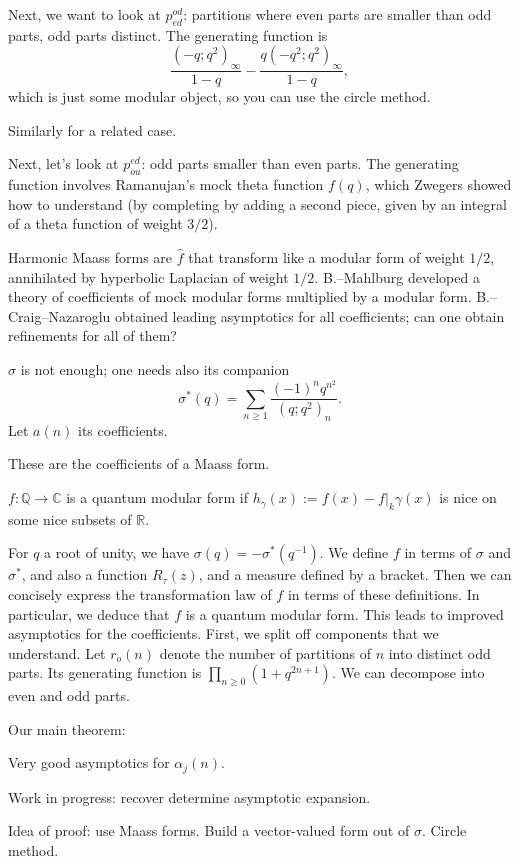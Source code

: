 \documentclass[reqno]{amsart} 
\begin{document}
Next, we want to look at $p_{e d}^{o d}$: partitions where even parts are smaller than odd parts, odd parts distinct.  The generating function is
\begin{equation*}
  \frac{(- q; q^2)_\infty}{ 1 - q}
  - \frac{q(- q^2 ; q^2)_\infty}{1 - q},
\end{equation*}
which is just some modular object, so you can use the circle method.

Similarly for a related case.

Next, let's look at $p_{o u}^{e d}$: odd parts smaller than even parts.  The generating function involves Ramanujan's mock theta function $f(q)$, which Zwegers showed how to understand (by completing by adding a second piece, given by an integral of a theta function of weight $3 /2$).

Harmonic Maass forms are $\hat{f}$ that transform like a modular form of weight $1/2$, annihilated by hyperbolic Laplacian of weight $1/2$.  B.--Mahlburg developed a theory of coefficients of mock modular forms multiplied by a modular form.  B.--Craig--Nazaroglu obtained leading asymptotics for all coefficients; can one obtain refinements for all of them?

$\sigma$ is not enough; one needs also its companion
\begin{equation*}
  \sigma^\ast(q) = \sum_{n \geq 1}
  \frac{(- 1)^n q^{n^2}}{(q; q^2)_n}.  
\end{equation*}
Let $a(n)$ its coefficients.
\begin{theorem}[Cohen]
  These are the coefficients of a Maass form.
\end{theorem}

\begin{definition}[Zagier]
  $f : \mathbb{Q} \rightarrow \mathbb{C}$ is a quantum modular form if $h_\gamma(x) := f(x) - f|_k \gamma(x)$ is nice on some nice subsets of $\mathbb{R}$.
\end{definition}

For $q$ a root of unity, we have $\sigma(q) = - \sigma^\ast(q^{-1})$.  We define $f$ in terms of $\sigma$ and $\sigma^\ast$, and also a function $R_\tau(z)$, and a measure defined by a bracket.  Then we can concisely express the transformation law of $f$ in terms of these definitions.  In particular, we deduce that $f$ is a quantum modular form.  This leads to improved asymptotics for the coefficients.  First, we split off components that we understand.  Let $r_o(n)$ denote the number of partitions of $n$ into distinct odd parts.  Its generating function is $\prod_{n \geq 0}(1 + q^{2 n + 1})$.  We can decompose into even and odd parts.

Our main theorem:
\begin{theorem}
  Very good asymptotics for $\alpha_j(n)$.
\end{theorem}

Work in progress: recover determine asymptotic expansion.

Idea of proof: use Maass forms.  Build a vector-valued form out of $\sigma$.  Circle method.


{} 
\end{document}
